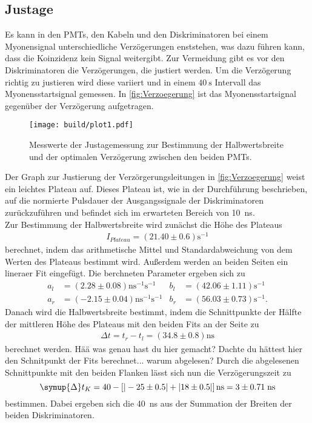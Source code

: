 \subsection{Justage}
\label{subsec:Justage}
Es kann in den PMTs, den Kabeln und den  Diskriminatoren bei einem Myonensignal unterschiedliche Verzögerungen enststehen, was dazu führen kann, dass die Koinzidenz kein Signal weitergibt.
Zur Vermeidung gibt es vor den Diskriminatoren die Verzögerungen, die justiert werden. Um die Verzögerung richtig zu justieren wird diese variiert und in einem $\qty{40}{\second}$ Intervall
das Myonensstartsignal gemessen. In \autoref{fig:Verzoegerung} ist das Myonensstartsignal gegenüber der Verzögerung aufgetragen.
\begin{figure}[H]
  \centering
  \texttt{[image: build/plot1.pdf]}
  \caption {Messwerte der Justagemessung zur Bestimmung der Halbwertsbreite und der optimalen Verzögerung zwischen den beiden PMTs.}
  \label{fig:Verzoegerung}
\end{figure}
Der Graph zur Justierung der Verzörgerungsleitungen in \autoref{fig:Verzoegerung} weist ein leichtes Plateau auf.
Dieses Plateau ist, wie in der Durchführung beschrieben, auf die normierte Pulsdauer der Ausgangssignale der Diskriminatoren zurückzuführen und befindet sich im erwarteten Bereich von \SI{10}{\nano \second}. \\
Zur Bestimmung der Halbwertsbreite wird zunächst die Höhe des Plateaus
\begin{align*}
    I_{Plateau} = (21.40 \pm 0.6) \si{\second^{-1}}
\end{align*}
berechnet, indem das arithmetische Mittel und Standardabweichung von dem Werten des Plateaus bestimmt wird.
Außerdem werden an beiden Seiten ein lineraer Fit eingefügt.
Die berchneten Parameter ergeben sich zu 
\begin{align}
  a_l &= (2.28 \pm 0.08)  \si{\nano\second^{-1}\second^{-1}} & b_l &= (42.06 \pm 1.11) \si{\second^{-1}} \\
  a_r &= (-2.15 \pm 0.04) \si{\nano\second^{-1}\second^{-1}} & b_r &= (56.03 \pm 0.73) \si{\second^{-1}}.
\end{align}
Danach wird die Halbwertsbreite bestimmt, indem die Schnittpunkte der Hälfte der mittleren Höhe des Plateaus mit den beiden Fits an der Seite zu
\begin{align*}
   \Delta t = t_r - t_l = (34.8 \pm 0.8) \si{\nano\second}
\end{align*}
berechnet werden.
Hää was genau hast du hier gemacht? Dachte du hättest hier den Schnitpunkt der Fits berechnet... warum abgelesen?
Durch die abgelesenen Schnittpunkte mit den beiden Flanken lässt sich nun die Verzögerungszeit zu
\begin{equation}
  \symup{\Delta}t_K = 40 - \left[ |-25 \pm 0.5| + |18 \pm 0.5| \right] \si{\nano\second} = \- 3 \pm 0.71\; \si{\nano\second}
\end{equation}
bestimmen. Dabei ergeben sich die \SI{40}{\nano\second} aus der Summation der Breiten der beiden Diskriminatoren.

